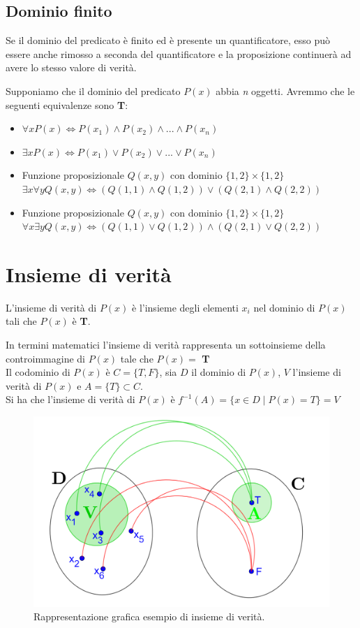 \subsection{Dominio finito}
Se il dominio del predicato è finito ed è presente un quantificatore, esso può essere anche rimosso a seconda del quantificatore e la proposizione continuerà ad avere lo stesso valore di verità.
\begin{example} Supponiamo che il dominio del predicato $P(x)$ abbia \textit{n} oggetti. Avremmo che le seguenti equivalenze sono \textbf{T}:
\begin{itemize}
    \item $\forall xP(x) \iff P(x_1) \wedge P(x_2) \wedge ... \wedge P(x_n)$
    \item $\exists xP(x) \iff P(x_1) \vee P(x_2) \vee ... \vee P(x_n)$
    \item Funzione proposizionale $Q(x, y)$ con dominio $\{1, 2\} \times \{1, 2\}$ \\
    $\exists x \forall y Q(x, y) \iff (Q(1,1) \wedge Q(1, 2)) \vee (Q(2,1) \wedge Q(2, 2))$
    \item Funzione proposizionale $Q(x, y)$ con dominio $\{1, 2\} \times \{1, 2\}$ \\
    $\forall x \exists y Q(x, y) \iff (Q(1, 1) \vee Q(1, 2)) \wedge (Q(2, 1) \vee Q(2, 2))$
\end{itemize}
\end{example}

\section{Insieme di verità}
L'insieme di verità di $P(x)$ è l'insieme degli elementi $x_i$ nel dominio di $P(x)$ tali che $P(x)$ è \textbf{T}.

In termini matematici l'insieme di verità rappresenta un sottoinsieme della controimmagine di $P(x)$ tale che $P(x)=$ \textbf{T} \\
Il codominio di $P(x)$ è $C=\{T, F\}$, sia $D$ il dominio di $P(x)$, $V$ l'insieme di verità di $P(x)$ e $A=\{T\}\subset C$. \\
Si ha che l'insieme di verità di $P(x)$ è $f^{-1}(A)=\{x\in D \mid P(x)=T\}=V$
\begin{figure}[H]
\centering
\includegraphics[scale=1.7]{chapters/logica_predicativa/figure_insieme_verita}
\caption{Rappresentazione grafica esempio di insieme di verità.}
\end{figure}